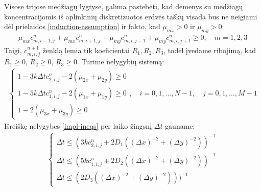 Visose trijose medžiagų lygtyse, galima pastebėti, kad dėmenys su medžiagų koncentracijomis iš aplinkinių diskretizuotos erdvės taškų visada bus ne neigiami dėl prielaidos \eqref{induction-assumption} ir fakto, kad $\mu_{mx}>0$ ir $\mu_{my}>0$:
\begin{align*}
  \mu_{mx}c^n_{m,i-1,j}+\mu_{mx}c^n_{m,i+1,j}+\mu_{my}c^n_{m,i,j-1}+\mu_{my}c^n_{m,i,j+1}\geqslant 0 ,\quad m=1,2,3
\end{align*}
\newpage
Taigi, $c^{n+1}_{m,i,j}$ ženklą lemia tik koeficientai $R_1, R_2, R_3$, todėl įvedame ribojimą, kad $R_1\geqslant 0$, $R_2\geqslant 0$, $R_3\geqslant 0$. Turime nelygybių sistemą:
\begin{align} \label{impl-ineqs}
  \begin{cases}
    1-3k\Delta tc^{n}_{2,i,j}-2(\mu_{2x}+\mu_{2y})\geqslant 0\\
    1-5k\Delta tc^{n}_{1,i,j}-2(\mu_{1x}+\mu_{1y})\geqslant 0\\
    1-2(\mu_{3x}+\mu_{3y})\geqslant 0
  \end{cases}, \quad i=0,1,\dots,N-1, \quad j=0,1,\dots,M-1
\end{align}
Išreiškę nelygybes \eqref{impl-ineqs} per laiko žingsnį $\Delta t$ gauname:
\begin{align} \label{dt-ineq}
  \begin{cases}
    \Delta t \leqslant (3kc^{n}_{2,i,j}+2D_1((\Delta x)^{-2}+(\Delta y)^{-2}))^{-1}\\
    \Delta t \leqslant (5kc^{n}_{1,i,j}+2D_2((\Delta x)^{-2}+(\Delta y)^{-2}))^{-1}\\
    \Delta t \leqslant (2D_3((\Delta x)^{-2}+(\Delta y)^{-2})))^{-1}
  \end{cases}
\end{align}

